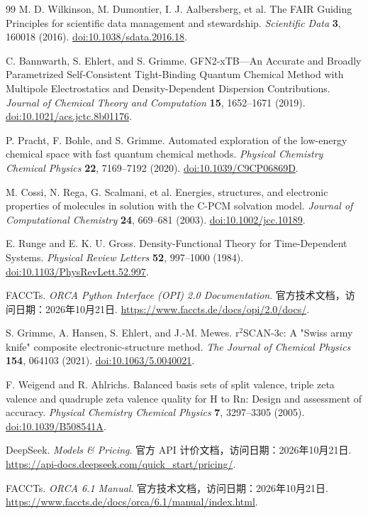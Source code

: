 \begin{thebibliography}{99}
  M. D. Wilkinson, M. Dumontier, I. J. Aalbersberg, et al.
  The FAIR Guiding Principles for scientific data management and stewardship.
  \emph{Scientific Data} \textbf{3}, 160018 (2016).
  \href{https://doi.org/10.1038/sdata.2016.18}{doi:10.1038/sdata.2016.18}.

  C. Bannwarth, S. Ehlert, and S. Grimme.
  GFN2-xTB---An Accurate and Broadly Parametrized Self-Consistent Tight-Binding Quantum Chemical
  Method with Multipole Electrostatics and Density-Dependent Dispersion Contributions.
  \emph{Journal of Chemical Theory and Computation} \textbf{15}, 1652--1671 (2019).
  \href{https://doi.org/10.1021/acs.jctc.8b01176}{doi:10.1021/acs.jctc.8b01176}.

  P. Pracht, F. Bohle, and S. Grimme.
  Automated exploration of the low-energy chemical space with fast quantum chemical methods.
  \emph{Physical Chemistry Chemical Physics} \textbf{22}, 7169--7192 (2020).
  \href{https://doi.org/10.1039/C9CP06869D}{doi:10.1039/C9CP06869D}.

  M. Cossi, N. Rega, G. Scalmani, et al.
  Energies, structures, and electronic properties of molecules in solution with the C-PCM solvation
  model.
  \emph{Journal of Computational Chemistry} \textbf{24}, 669--681 (2003).
  \href{https://doi.org/10.1002/jcc.10189}{doi:10.1002/jcc.10189}.

  E. Runge and E. K. U. Gross.
  Density-Functional Theory for Time-Dependent Systems.
  \emph{Physical Review Letters} \textbf{52}, 997--1000 (1984).
  \href{https://doi.org/10.1103/PhysRevLett.52.997}{doi:10.1103/PhysRevLett.52.997}.

  FACCTs.
  \emph{ORCA Python Interface (OPI) 2.0 Documentation}.
  官方技术文档，访问日期：2026年10月21日.
  \url{https://www.faccts.de/docs/opi/2.0/docs/}.

  S. Grimme, A. Hansen, S. Ehlert, and J.-M. Mewes.
  r$^{2}$SCAN-3c: A "Swiss army knife" composite electronic-structure method.
  \emph{The Journal of Chemical Physics} \textbf{154}, 064103 (2021).
  \href{https://doi.org/10.1063/5.0040021}{doi:10.1063/5.0040021}.

  F. Weigend and R. Ahlrichs.
  Balanced basis sets of split valence, triple zeta valence and quadruple zeta valence quality for H
  to Rn: Design and assessment of accuracy.
  \emph{Physical Chemistry Chemical Physics} \textbf{7}, 3297--3305 (2005).
  \href{https://doi.org/10.1039/B508541A}{doi:10.1039/B508541A}.

  DeepSeek.
  \emph{Models \& Pricing}.
  官方 API 计价文档，访问日期：2026年10月21日.
  \url{https://api-docs.deepseek.com/quick_start/pricing/}.

  FACCTs.
  \emph{ORCA 6.1 Manual}.
  官方技术文档，访问日期：2026年10月21日.
  \url{https://www.faccts.de/docs/orca/6.1/manual/index.html}.

\end{thebibliography}
